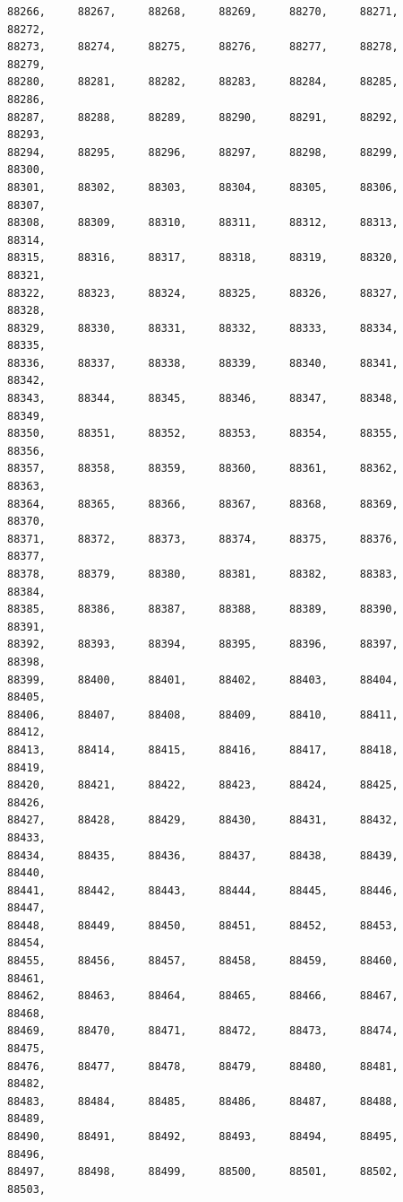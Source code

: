 \documentclass[a4paper,11pt]{report}
\begin{document}
\begin{verbatim}
88266,     88267,     88268,     88269,     88270,     88271,     88272,     
88273,     88274,     88275,     88276,     88277,     88278,     88279,     
88280,     88281,     88282,     88283,     88284,     88285,     88286,     
88287,     88288,     88289,     88290,     88291,     88292,     88293,     
88294,     88295,     88296,     88297,     88298,     88299,     88300,     
88301,     88302,     88303,     88304,     88305,     88306,     88307,     
88308,     88309,     88310,     88311,     88312,     88313,     88314,     
88315,     88316,     88317,     88318,     88319,     88320,     88321,     
88322,     88323,     88324,     88325,     88326,     88327,     88328,     
88329,     88330,     88331,     88332,     88333,     88334,     88335,     
88336,     88337,     88338,     88339,     88340,     88341,     88342,     
88343,     88344,     88345,     88346,     88347,     88348,     88349,     
88350,     88351,     88352,     88353,     88354,     88355,     88356,     
88357,     88358,     88359,     88360,     88361,     88362,     88363,     
88364,     88365,     88366,     88367,     88368,     88369,     88370,     
88371,     88372,     88373,     88374,     88375,     88376,     88377,     
88378,     88379,     88380,     88381,     88382,     88383,     88384,     
88385,     88386,     88387,     88388,     88389,     88390,     88391,     
88392,     88393,     88394,     88395,     88396,     88397,     88398,     
88399,     88400,     88401,     88402,     88403,     88404,     88405,     
88406,     88407,     88408,     88409,     88410,     88411,     88412,     
88413,     88414,     88415,     88416,     88417,     88418,     88419,     
88420,     88421,     88422,     88423,     88424,     88425,     88426,     
88427,     88428,     88429,     88430,     88431,     88432,     88433,     
88434,     88435,     88436,     88437,     88438,     88439,     88440,     
88441,     88442,     88443,     88444,     88445,     88446,     88447,     
88448,     88449,     88450,     88451,     88452,     88453,     88454,     
88455,     88456,     88457,     88458,     88459,     88460,     88461,     
88462,     88463,     88464,     88465,     88466,     88467,     88468,     
88469,     88470,     88471,     88472,     88473,     88474,     88475,     
88476,     88477,     88478,     88479,     88480,     88481,     88482,     
88483,     88484,     88485,     88486,     88487,     88488,     88489,     
88490,     88491,     88492,     88493,     88494,     88495,     88496,     
88497,     88498,     88499,     88500,     88501,     88502,     88503,     

\end{verbatim}
\end{document}
